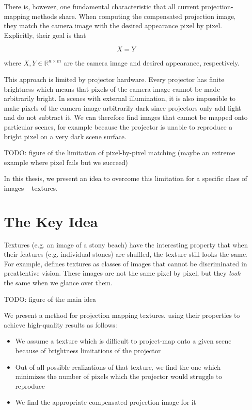 There is, however, one fundamental characteristic that all current projection-mapping methods share. When computing the compensated projection image, they match the camera image with the desired appearance pixel by pixel. Explicitly, their goal is that

\[
    X = Y
\]

where \(X,Y \in \mathbb{R}^{n \times m}\) are the camera image and desired appearance, respectively.

This approach is limited by projector hardware. Every projector has finite brightness which means that pixels of the camera image cannot be made arbitrarily bright. In scenes with external illumination, it is also impossible to make pixels of the camera image arbitrarily dark since projectors only add light and do not subtract it. We can therefore find images that cannot be mapped onto particular scenes, for example because the projector is unable to reproduce a bright pixel on a very dark scene surface.

{\color{red} TODO: figure of the limitation of pixel-by-pixel matching (maybe an extreme example where pixel fails but we succeed)}

In this thesis, we present an idea to overcome this limitation for a specific class of images -- textures.

\section{The Key Idea}
\label{section:intro-key_idea}

Textures (e.g. an image of a stony beach) have the interesting property that when their features (e.g. individual stones) are shuffled, the texture still looks the same. For example, \citet*{Julesz1995} defines textures as classes of images that cannot be discriminated in preattentive vision. These images are not the same pixel by pixel, but they \textit{look} the same when we glance over them.

{\color{red} TODO: figure of the main idea}

We present a method for projection mapping textures, using their properties to achieve high-quality results as follows:

\begin{itemize}
    \item We assume a texture which is difficult to project-map onto a given scene because of brightness limitations of the projector
    \item Out of all possible realizations of that texture, we find the one which minimizes the number of pixels which the projector would struggle to reproduce
    \item We find the appropriate compensated projection image for it
\end{itemize}

